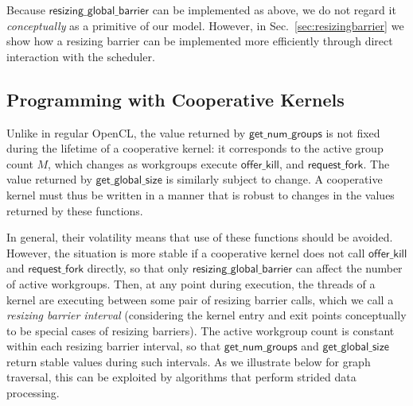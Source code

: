 \documentclass[sigconf]{acmart}
\newcommand{\mysec}{Sec.~}
\newcommand{\offerfork}{\mathsf{request\_fork}}
\newcommand{\offerkill}{\mathsf{offer\_kill}}
\newcommand{\resizingglobalbarrier}{\mathsf{resizing\_global\_barrier}}
\newcommand{\getnumgroups}{\mathsf{get\_num\_groups}}
\newcommand{\getglobalsize}{\mathsf{get\_global\_size}}
\begin{document}
{Because $\resizingglobalbarrier$ can be implemented as above, we do
not regard it \emph{conceptually} as a primitive of our model.
However, in \mysec\ref{sec:resizingbarrier} we show how a resizing
barrier can be implemented more efficiently through direct interaction
with the scheduler.

\subsection{Programming with Cooperative Kernels}\label{sec:programmingguidelines}


 Unlike in regular OpenCL, the
value returned by $\getnumgroups$ is not fixed during the lifetime of
a cooperative kernel: it corresponds to the active group count $M$,
which changes as workgroups execute $\offerkill$, and $\offerfork$.
The value returned by $\getglobalsize$ is similarly subject to change.
A cooperative kernel must thus be written in a manner that is robust
to changes in the values returned by these functions.

In general, their volatility means that use of these functions should
be avoided.  However, the situation is more stable if a cooperative
kernel does not call $\offerkill$ and $\offerfork$ directly, so that
only $\resizingglobalbarrier$ can affect the number of active
workgroups.  Then, at any point during execution, the threads of a
kernel are executing between some pair of resizing barrier calls,
which we call a \emph{resizing barrier interval} (considering the
kernel entry and exit points conceptually to be special cases of
resizing barriers).  The active workgroup count is constant within
each resizing barrier interval, so that $\getnumgroups$ and
$\getglobalsize$ return stable values during such intervals.
%
As we illustrate below for graph traversal, this can be exploited by algorithms that perform strided
data processing.


}
\end{document}
